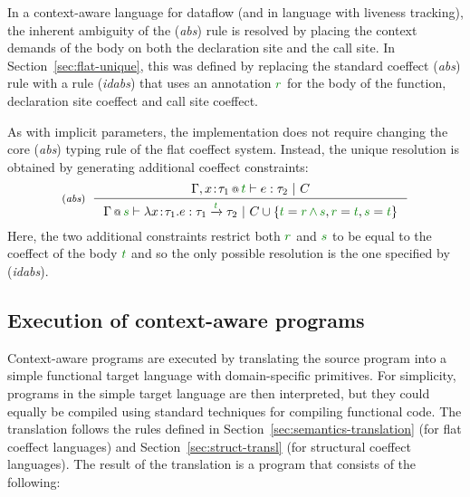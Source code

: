 \begin{example}
In a context-aware language for dataflow (and in language with liveness tracking), the inherent
ambiguity of the (\emph{abs}) rule is resolved by placing the context demands of the body on
both the declaration site and the call site. In Section~\ref{sec:flat-unique}, this was defined by
replacing the standard coeffect (\emph{abs}) rule with a rule (\emph{idabs}) that uses an
annotation $\cclrd{r}$ for the body of the function, declaration site coeffect and call site coeffect.

As with implicit parameters, the implementation does not require changing the core (\emph{abs})
typing rule of the flat coeffect system. Instead, the unique resolution is obtained by generating
additional coeffect constraints:
%
\begin{equation*}
\tyrule{abs}
  {\coctx{\Gamma, x\!:\!\tau_1}{\cclrd{t}} \vdash e : \tau_2 ~|~ C}
  {\coctx{\Gamma}{\cclrd{s}} \vdash \lambda x\!:\!\tau_1.e : \tau_1 \xrightarrow{\cclrd{t}} \tau_2 ~|~
    C\cup\{\cclrd{t}=\cclrd{r} \,\czip\, \cclrd{s}, \cclrd{r}=\cclrd{t}, \cclrd{s}=\cclrd{t} \}}
\end{equation*}
%
Here, the two additional constraints restrict both $\cclrd{r}$ and $\cclrd{s}$ to be equal to the
coeffect of the body $\cclrd{t}$ and so the only possible resolution is the one specified by
(\emph{idabs}).
\end{example}


\subsection{Execution of context-aware programs}
\label{sec:impl-theory-transl}

Context-aware programs are executed by translating the source program into a simple functional
target language with domain-specific primitives. For simplicity, programs in the simple target
language are then interpreted, but they could equally be compiled using standard techniques for
compiling functional code. The translation follows the rules defined in Section~\ref{sec:semantics-translation}
(for flat coeffect languages) and Section~\ref{sec:struct-transl} (for structural coeffect
languages). The result of the translation is a program that consists of the following:

